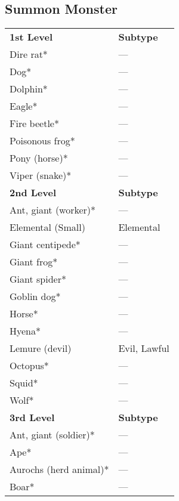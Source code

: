 \subsection{Summon Monster}
\begin{tabular}{ll}
\textbf{1st Level}        & \textbf{Subtype} \\
Dire rat*                 & ---                \\
Dog*                      & ---                \\
Dolphin*                  & ---                \\
Eagle*                    & ---                \\
Fire beetle*              & ---                \\
Poisonous frog*           & ---                \\
Pony (horse)*             & ---                \\
Viper (snake)*            & ---                \\
\textbf{2nd Level}        & \textbf{Subtype} \\
Ant, giant (worker)*      & ---                \\
Elemental (Small)         & Elemental        \\
Giant centipede*          & ---                \\
Giant frog*               & ---                \\
Giant spider*             & ---                \\
Goblin dog*               & ---                \\
Horse*                    & ---                \\
Hyena*                    & ---                \\
Lemure (devil)            & Evil, Lawful     \\
Octopus*                  & ---                \\
Squid*                    & ---                \\
Wolf*                     & ---                \\
\textbf{3rd Level}        & \textbf{Subtype} \\
Ant, giant (soldier)*     & ---                \\
Ape*                      & ---                \\
Aurochs (herd animal)*    & ---                \\
Boar*                     & ---                \\

\end{tabular}
